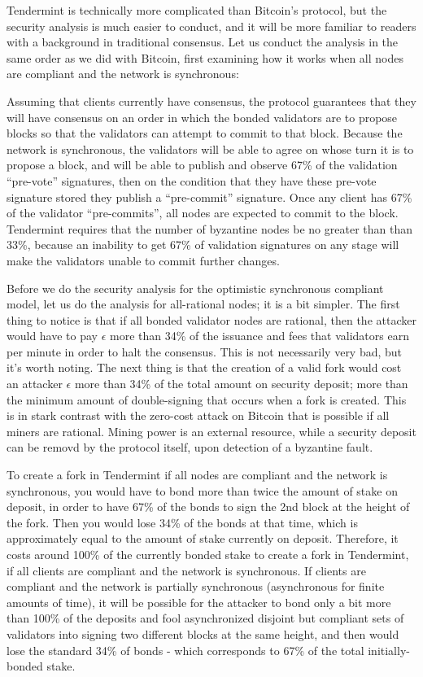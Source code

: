 \documentclass[11pt,a4paper]{article}
\theoremstyle{plain}
\theoremstyle{definition}
\begin{document}
Tendermint is technically more complicated than Bitcoin's protocol, but the security analysis is much easier to conduct, and it will be more familiar to readers with a background in traditional consensus. Let us conduct the analysis in the same order as we did with Bitcoin, first examining how it works when all nodes are compliant and the network is synchronous:

Assuming that clients currently have consensus, the protocol guarantees that they will have consensus on an order in which the bonded validators are to propose blocks so that the validators can attempt to commit to that block. Because the network is synchronous, the validators will be able to agree on whose turn it is to propose a block, and will be able to publish and observe 67\% of the validation ``pre-vote'' signatures, then on the condition that they have these pre-vote signature stored they publish a ``pre-commit'' signature. Once any client has 67\% of the validator ``pre-commits'', all nodes are expected to commit to the block. Tendermint requires that the number of byzantine nodes be no greater than than 33\%, because an inability to get 67\% of validation signatures on any stage will make the validators unable to commit further changes. 

Before we do the security analysis for the optimistic synchronous compliant model, let us do the analysis for all-rational nodes; it is a bit simpler. The first thing to notice is that if all bonded validator nodes are rational, then the attacker would have to pay $\epsilon$ more than 34\% of the issuance and fees that validators earn per minute in order to halt the consensus. This is not necessarily very bad, but it's worth noting. The next thing is that the creation of a valid fork would cost an attacker $\epsilon$ more than 34\% of the total amount on security deposit; more than the minimum amount of double-signing that occurs when a fork is created. This is in stark contrast with the zero-cost attack on Bitcoin that is possible if all miners are rational. Mining power is an external resource, while a security deposit can be removd by the protocol itself, upon detection of a byzantine fault.

To create a fork in Tendermint if all nodes are compliant and the network is synchronous, you would have to bond more than twice the amount of stake on deposit, in order to have 67\% of the bonds to sign the 2nd block at the height of the fork. Then you would lose 34\% of the bonds at that time, which is approximately equal to the amount of stake currently on deposit. Therefore, it costs around 100\% of the currently bonded stake to create a fork in Tendermint, if all clients are compliant and the network is synchronous. If clients are compliant and the network is partially synchronous (asynchronous for finite amounts of time), it will be possible for the attacker to bond only a bit more than 100\% of the deposits and fool asynchronized disjoint but compliant sets of validators into signing two different blocks at the same height, and then would lose the standard 34\% of bonds - which corresponds to 67\% of the total initially-bonded stake. 
\end{document}
